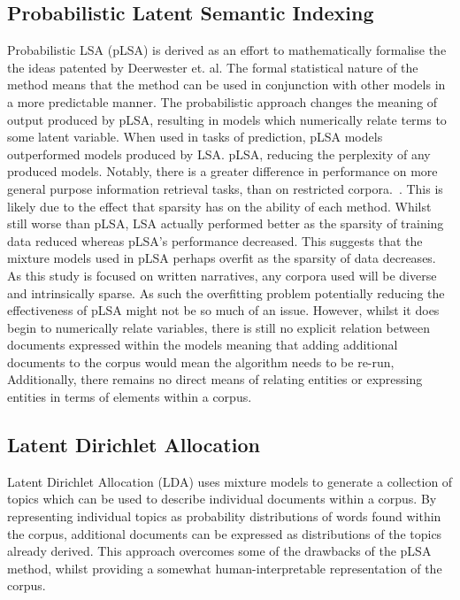 \documentclass[10pt]{report}
\begin{document}
\subsection{Probabilistic Latent Semantic Indexing}
Probabilistic LSA (pLSA) is derived as an effort to mathematically formalise the the ideas patented by Deerwester et. al. The formal statistical nature of the method means that the method can be used in conjunction with other models in a more predictable manner. The probabilistic approach changes the meaning of output produced by pLSA, resulting in models which numerically relate terms to some latent variable. 
When used in tasks of prediction, pLSA models outperformed models produced by LSA. pLSA, reducing the perplexity of any produced models. Notably, there is a greater difference in performance on more general purpose information retrieval tasks, than on restricted corpora.~\cite{Hofmann1999-qb}. This is likely due to the effect that sparsity has on the ability of each method. Whilst still worse than pLSA, LSA actually performed better as the sparsity of training data reduced whereas pLSA’s performance decreased. This suggests that the mixture models used in pLSA perhaps overfit as the sparsity of data decreases.
As this study is focused on written narratives, any corpora used will be diverse and intrinsically sparse. As such the overfitting problem potentially reducing the effectiveness of pLSA might not be so much of an issue. However, whilst it does begin to numerically relate variables, there is still no explicit relation between documents expressed within the models meaning that adding additional documents to the corpus would mean the algorithm needs to be re-run, Additionally, there remains no direct means of relating entities or expressing entities in terms of elements within a corpus.

\subsection{Latent Dirichlet Allocation}
Latent Dirichlet Allocation (LDA) uses mixture models to generate a collection of topics which can be used to describe individual documents within a corpus. By representing individual topics as probability distributions of words found within the corpus, additional documents can be expressed as distributions of the topics already derived. This approach overcomes some of the drawbacks of the pLSA method, whilst providing a somewhat human-interpretable representation of the corpus.~\cite{Blei2003-dj}
\end{document}
